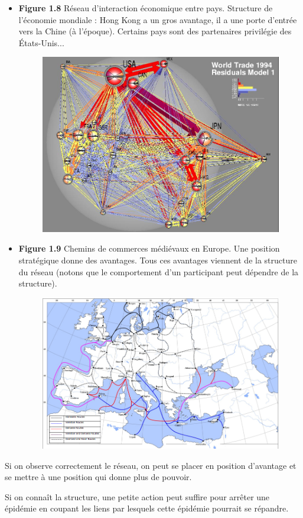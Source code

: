 \begin{itemize}
	\item \textbf{Figure 1.8} Réseau d'interaction économique entre pays. Structure de l'économie mondiale : Hong Kong a un gros avantage, il a une porte d'entrée vers la Chine (à l'époque). Certains pays sont des partenaires privilégie des États-Unis... 

\begin{figure}[!ht]
\centering
\includegraphics[width=0.8\linewidth]{images/network_international_trade.png}
\end{figure}

	\item \textbf{Figure 1.9} Chemins de commerces médiévaux en Europe. Une position stratégique donne des avantages. Tous ces avantages viennent de la structure du réseau (notons que le comportement d'un participant peut dépendre de la structure).
\begin{figure}[!H]
\centering
\includegraphics[width=0.9\linewidth]{images/map_of_medieval_trade_routes.png}
\end{figure}
\end{itemize}

Si on observe correctement le réseau, on peut se placer en position d'avantage et se mettre à une position qui donne plus de pouvoir.

Si on connaît la structure, une petite action peut suffire pour arrêter une épidémie en coupant les liens par lesquels cette épidémie pourrait se répandre.
